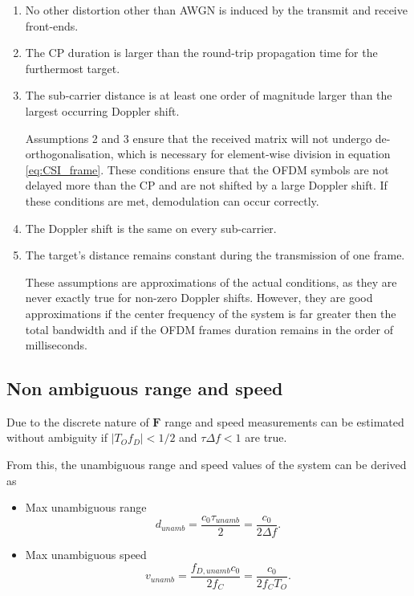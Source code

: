     \begin{enumerate}
    	\item No other distortion other than AWGN is induced by the transmit and receive front-ends.
    	\item The CP duration is larger than the round-trip propagation time for the furthermost target.
    	\item The sub-carrier distance is at least one order of magnitude larger than the largest occurring Doppler shift.
    	
		Assumptions 2 and 3 ensure that the received matrix will not undergo de-orthogonalisation, which is necessary for element-wise division in equation \ref{eq:CSI_frame}. These conditions ensure that the OFDM symbols are not delayed more than the CP and are not shifted by a large Doppler shift. If these conditions are met, demodulation can occur correctly.
    	
    	\item The Doppler shift is the same on every sub-carrier.
    	\item The target’s distance remains constant during the transmission of one frame.
    	
    	These assumptions are approximations of the actual conditions, as they are never exactly true for non-zero Doppler shifts. However, they are good approximations if the center frequency of the system is far greater then the total bandwidth and if the OFDM frames duration remains in the order of milliseconds.
    \end{enumerate}
    
    \subsection{Non ambiguous range and speed}
    
        Due to the discrete nature of $\mathbf{F}$ range and speed measurements can be estimated without ambiguity if $|T_O f_D| < 1/2$ and $\tau \Delta f < 1$ are true.
        
        From this, the unambiguous range and speed values of the system can be derived as
        
        \begin{itemize}
            \item Max unambiguous range
            $$ d_{unamb} = \frac{c_0 \tau_{unamb}}{2} = \frac{c_0}{2\Delta f}.$$
            \item Max unambiguous speed
            $$ v_{unamb} = \frac{f_{D,unamb} c_0}{2f_C} = \frac{c_0}{2f_C T_O}.$$
        \end{itemize}
        
